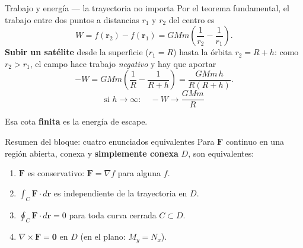 \documentclass[11pt,aspectratio=169]{beamer}
\begin{document}
\begin{frame}{Trabajo y energía --- la trayectoria no importa}
  Por el teorema fundamental, el trabajo entre dos puntos a distancias $r_1$ y $r_2$ del centro es
  \[
    W=f(\mathbf r_2)-f(\mathbf r_1)=GMm\left(\frac{1}{r_2}-\frac{1}{r_1}\right).
  \]
  \pause
  \textbf{Subir un satélite} desde la superficie ($r_1=R$) hasta la órbita $r_2=R+h$: como $r_2>r_1$, el campo hace trabajo \emph{negativo} y hay que aportar
  \[
    -W=GMm\left(\frac1R-\frac{1}{R+h}\right)=\frac{GMm\,h}{R(R+h)} .
  \]
  \pause
  \[
    \boxed{\text{si } h\to\infty:\quad -W\to\frac{GMm}{R}}
  \]
  \pause
  \begin{center}\small\color{gray60} Esa cota \textbf{finita} es la energía de escape. \end{center}
\end{frame}

\begin{frame}{Resumen del bloque: cuatro enunciados equivalentes}
  Para $\mathbf F$ continuo en una región abierta, conexa y \textbf{simplemente conexa} $D$, son equivalentes:
  \vspace{8pt}
  \begin{enumerate}
    \setlength{\itemsep}{5pt}
    \item $\mathbf F$ es conservativo: $\mathbf F=\nabla f$ para alguna $f$.
    \pause
    \item $\displaystyle\int_C \mathbf F\cdot d\mathbf r$ es independiente de la trayectoria en $D$.
    \pause
    \item $\displaystyle\oint_C \mathbf F\cdot d\mathbf r = 0$ para toda curva cerrada $C\subset D$.
    \pause
    \item $\nabla\times\mathbf F=\mathbf 0$ en $D$ (en el plano: $M_y=N_x$).
  \end{enumerate}
  \vspace{10pt}
  \pause
\end{frame}

\end{document}
